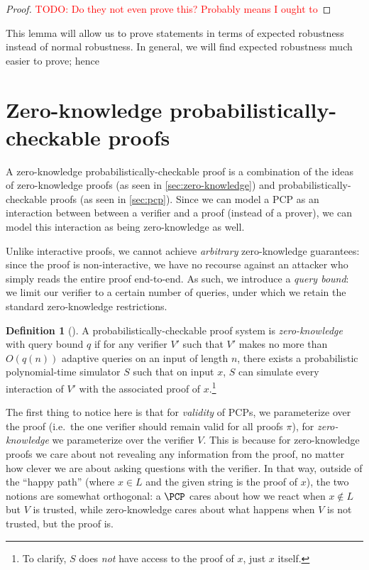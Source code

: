 \documentclass[english,12pt]{reedthesis}
\theoremstyle{plain}
\theoremstyle{definition}
\newtheorem{defn}[defn]{Definition}
\theoremstyle{remark}
\newcommand{\TODO}[1]{\textcolor{red}{TODO: #1}}
\begin{document}
\begin{proof}
  \TODO{Do they not even prove this? Probably means I ought to}
\end{proof}

This lemma will allow us to prove statements in terms of expected robustness
instead of normal robustness. In general, we will find expected robustness much
easier to prove; hence

\section{Zero-knowledge probabilistically-checkable proofs}\label{sec:pzkpcp}

A zero-knowledge probabilistically-checkable proof is a combination of the ideas
of zero-knowledge proofs (as seen in \cref{sec:zero-knowledge}) and
probabilistically-checkable proofs (as seen in \cref{sec:pcp}). Since we can
model a PCP as an interaction between between a verifier and a proof (instead of
a prover), we can model this interaction as being zero-knowledge as well.

Unlike interactive proofs, we cannot achieve \emph{arbitrary} zero-knowledge
guarantees: since the proof is non-interactive, we have no recourse against an
attacker who simply reads the entire proof end-to-end. As such, we introduce a
\emph{query bound}: we limit our verifier to a certain number
of queries, under which we retain the standard zero-knowledge restrictions.

\begin{defn}[{\cite[Def.\ 8.6]{GOS24}}]\label{def:pzkpcp}
  A probabilistically-checkable proof system is \emph{zero-knowledge} with query
  bound $q$ if for any verifier $V'$ such that $V'$ makes no more than $O(q(n))$
  adaptive queries on an input of length $n$, there exists a probabilistic
  polynomial-time simulator $S$ such that on input $x$, $S$ can simulate every
  interaction of $V'$ with the associated proof of $x$.\footnote{To clarify, $S$
    does \emph{not} have access to the proof of $x$, just $x$ itself.}
\end{defn}

The first thing to notice here is that for \emph{validity} of PCPs, we
parameterize over the proof (i.e.\ the one verifier should remain valid for all
proofs $\pi$), for \emph{zero-knowledge} we parameterize over the verifier $V$.
This is because for zero-knowledge proofs we care about not revealing any
information from the proof, no matter how clever we are about asking questions
with the verifier. In that way, outside of the ``happy path'' (where $x \in L$ and
the given string is the proof of $x$), the two notions are somewhat orthogonal:
a $\PCP$ cares about how we react when $x \notin L$ but $V$ is trusted, while
zero-knowledge cares about what happens when $V$ is not trusted, but the proof
is.
\end{document}
